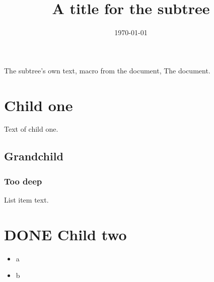 \documentclass[11pt]{article}
\date{\today}
\title{A title for the subtree}
\begin{document}
\maketitle
\tableofcontents

The subtree's own text, macro from the document, The document.
\section{Child one}
\label{sec:org1f85fd9}
Text of child one.
\subsection{Grandchild}
\label{sec:org47118c0}
\subsubsection{Too deep}
\label{sec:orgaf3ed89}
List item text.
\section{{\bfseries\sffamily DONE} Child two}
\label{sec:org0e4d337}
\begin{itemize}
\item a
\item b
\end{itemize}
\end{document}
